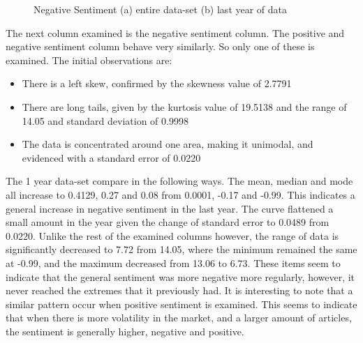 \begin{figure}[h!]
    \centering
    \caption{Negative Sentiment (a) entire data-set (b) last year of data}
    \label{fig:negativeDesc}
\end{figure}

The next column examined is the negative sentiment column. The positive and negative sentiment column behave very similarly. So only one of these is examined. The initial observations are:
\begin{itemize}
    \item There is a left skew, confirmed by the skewness value of 2.7791
    \item There are long tails, given by the kurtosis value of 19.5138 and the range of 14.05 and standard deviation of 0.9998
    \item The data is concentrated around one area, making it unimodal, and evidenced with a standard error of 0.0220
\end{itemize}
The 1 year data-set compare in the following ways. The mean, median and mode all increase to 0.4129, 0.27 and 0.08 from 0.0001, -0.17 and -0.99. This indicates a general increase in negative sentiment in the last year. The curve flattened a small amount in the year given the change of standard error to 0.0489 from 0.0220. Unlike the rest of the examined columns however, the range of data is significantly decreased to 7.72 from 14.05, where the minimum remained the same at -0.99, and the maximum decreased from 13.06 to 6.73. These items seem to indicate that the general sentiment was more negative more regularly, however, it never reached the extremes that it previously had. It is interesting to note that a similar pattern occur when positive sentiment is examined. This seems to indicate that when there is more volatility in the market, and a larger amount of articles, the sentiment is generally higher, negative and positive.

